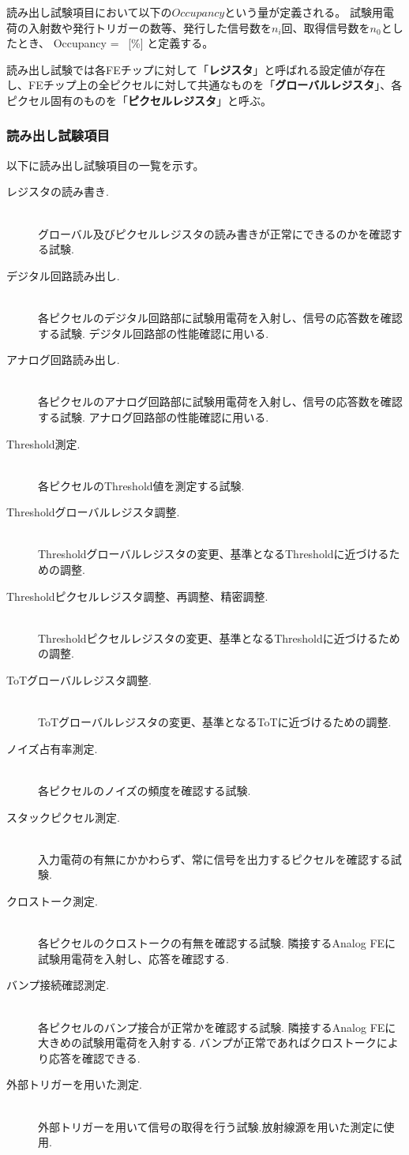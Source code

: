 読み出し試験項目において以下の$Occupancy$という量が定義される。
試験用電荷の入射数や発行トリガーの数等、発行した信号数を$n_i$回、取得信号数を$n_0$としたとき、
\bbb
\label{occupancy}
Occupancy =  ~[\%]
\eee
と定義する。

読み出し試験では各FEチップに対して「\textbf{レジスタ}」と呼ばれる設定値が存在し、FEチップ上の全ピクセルに対して共通なものを「\textbf{グローバルレジスタ}」、各ピクセル固有のものを「\textbf{ピクセルレジスタ}」と呼ぶ。

\clearpage
\subsubsection{読み出し試験項目}
以下に読み出し試験項目の一覧を示す。
\begin{description}
  \item[レジスタの読み書き.]\mbox{}\\
グローバル及びピクセルレジスタの読み書きが正常にできるのかを確認する試験.
  \item[デジタル回路読み出し.]\mbox{} \\
各ピクセルのデジタル回路部に試験用電荷を入射し、信号の応答数を確認する試験. デジタル回路部の性能確認に用いる.
  \item[アナログ回路読み出し.]\mbox{}\\
各ピクセルのアナログ回路部に試験用電荷を入射し、信号の応答数を確認する試験. アナログ回路部の性能確認に用いる.
  \item[Threshold測定.]\mbox{}\\
各ピクセルのThreshold値を測定する試験.
  \item[Thresholdグローバルレジスタ調整.]\mbox{}\\
Thresholdグローバルレジスタの変更、基準となるThresholdに近づけるための調整.
  \item[Thresholdピクセルレジスタ調整、再調整、精密調整.]\mbox{}\\
Thresholdピクセルレジスタの変更、基準となるThresholdに近づけるための調整.
  \item[ToTグローバルレジスタ調整.]\mbox{}\\
ToTグローバルレジスタの変更、基準となるToTに近づけるための調整.
  \item[ノイズ占有率測定.]\mbox{}\\
各ピクセルのノイズの頻度を確認する試験.
  \item[スタックピクセル測定.]\mbox{}\\
入力電荷の有無にかかわらず、常に信号を出力するピクセルを確認する試験.
  \item[クロストーク測定.]\mbox{}\\
各ピクセルのクロストークの有無を確認する試験. 隣接するAnalog FEに試験用電荷を入射し、応答を確認する.
  \item[バンプ接続確認測定.]\mbox{}\\
各ピクセルのバンプ接合が正常かを確認する試験. 隣接するAnalog FEに大きめの試験用電荷を入射する. バンプが正常であればクロストークにより応答を確認できる.
  \item[外部トリガーを用いた測定.]\mbox{}\\
外部トリガーを用いて信号の取得を行う試験.放射線源を用いた測定に使用.
\end{description}

